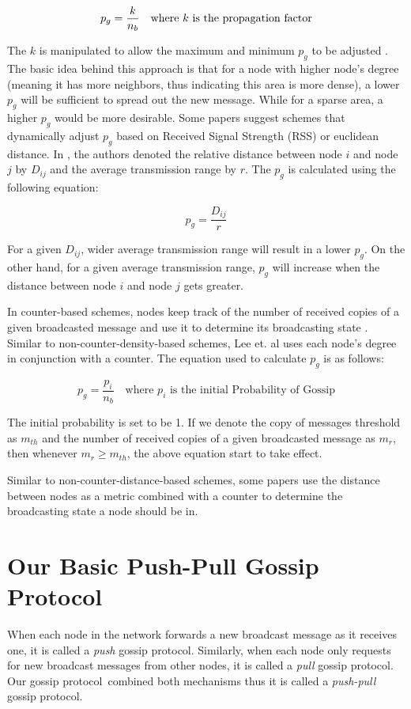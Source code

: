 \documentclass[onehalf,11pt]{beavtex}
\newcommand{\gp}{gossip protocol}
\newcommand{\pog}{Probability of Gossip}
\begin{document}
\[ p_g = \frac{k}{n_b} \mbox{\quad where $k$ is the propagation factor}\]

The $k$ is manipulated to allow the maximum and minimum $p_g$ to be adjusted \cite{cartigny2003border}. The basic idea behind this approach is that for a node with higher node's degree (meaning it has more neighbors, thus indicating this area is more dense), a lower $p_g$ will be sufficient to spread out the new message. While for a sparse area, a higher $p_g$ would be more desirable. Some papers \cite{qing2010dynamic}\cite{wisitpongphan2007broadcast} suggest schemes that dynamically adjust $p_g$ based on Received Signal Strength (RSS) or euclidean distance. In \cite{wisitpongphan2007broadcast}, the authors denoted the relative distance between node $i$ and node $j$ by $D_{ij}$ and the average transmission range by $r$. The $p_g$ is calculated using the following equation:

\[ p_g = \frac{D_{ij}}{r}\]

For a given $D_{ij}$, wider average transmission range will result in a lower $p_g$. On the other hand, for a given average transmission range, $p_g$ will increase when the distance between node $i$ and node $j$ gets greater.

In counter-based schemes, nodes keep track of the number of received copies of a given broadcasted message and use it to determine its broadcasting state \cite{2015survey}. Similar to non-counter-density-based schemes, Lee et. al \cite{lee2010adaptive} uses each node's degree in conjunction with a counter. The equation used to calculate $p_g$ is as follows:

\[ p_g = \frac{p_i}{n_b} \quad \mbox{where } p_i \mbox{ is the initial \pog}\]

The initial probability is set to be 1. If we denote the copy of messages threshold as $m_{th}$ and the number of received copies of a given broadcasted message as $m_r$, then whenever $m_r \geq m_{th}$, the above equation start to take effect.

Similar to non-counter-distance-based schemes, some papers \cite{khan2008distance}\cite{ling2005coverage} use the distance between nodes as a metric combined with a counter to determine the broadcasting state a node should be in. 

\section{Our Basic Push-Pull Gossip Protocol} \label{pp}
When each node in the network forwards a new broadcast message as it receives one, it is called a \emph{push} \gp. Similarly, when each node only requests for new broadcast messages from other nodes, it is called  a \emph{pull} \gp. Our \gp ~combined both mechanisms thus it is called a \emph{push-pull} \gp. 
\end{document}
